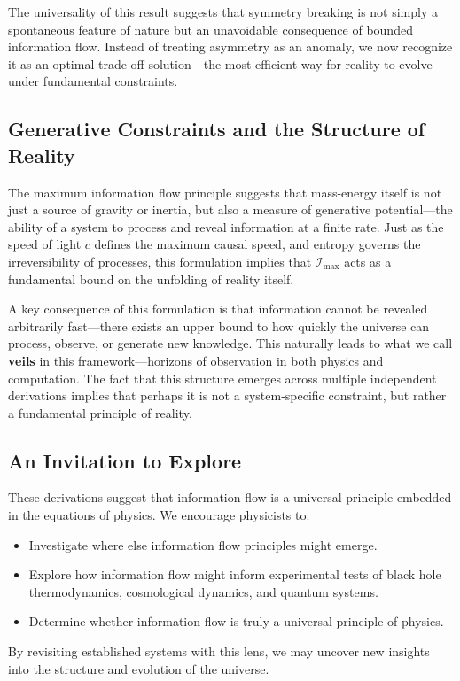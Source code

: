 \documentclass[12pt]{article}
\begin{document}
The universality of this result suggests that symmetry breaking is not simply a spontaneous feature of nature but an unavoidable consequence of bounded information flow. Instead of treating asymmetry as an anomaly, we now recognize it as an optimal trade-off solution—the most efficient way for reality to evolve under fundamental constraints.


\subsection{Generative Constraints and the Structure of Reality}

The maximum information flow principle suggests that mass-energy itself is not just a source of gravity or inertia, but also a measure of generative potential—the ability of a system to process and reveal information at a finite rate. Just as the speed of light \( c \) defines the maximum causal speed, and entropy governs the irreversibility of processes, this formulation implies that \( \mathcal{I}_{\text{max}} \) acts as a fundamental bound on the unfolding of reality itself.

A key consequence of this formulation is that information cannot be revealed arbitrarily fast—there exists an upper bound to how quickly the universe can process, observe, or generate new knowledge. This naturally leads to what we call \textbf{veils} in this framework—horizons of observation in both physics and computation. The fact that this structure emerges across multiple independent derivations implies that perhaps it is not a system-specific constraint, but rather a fundamental principle of reality.

\subsection{An Invitation to Explore}

These derivations suggest that information flow is a universal principle embedded in the equations of physics. We encourage physicists to:
\begin{itemize}
    \item Investigate where else information flow principles might emerge.
    \item Explore how information flow might inform experimental tests of black hole thermodynamics, cosmological dynamics, and quantum systems.
    \item Determine whether information flow is truly a universal principle of physics.
\end{itemize}
By revisiting established systems with this lens, we may uncover new insights into the structure and evolution of the universe.
\end{document}
